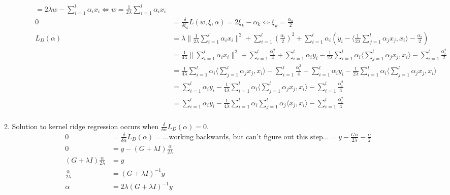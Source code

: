 \documentclass{article}
\newcommand*{\0}{\Vec{0}}
\newcommand*{\al}{\alpha}
\newcommand*{\de}{\delta}
\newcommand*{\la}{\lambda}
\begin{document}
\begin{enumerate}
\begin{enumerate}
\begin{description}
\begin{align*}
							= 2\la w - \sum_{i=1}^l\al_i x_i \iff
							w = \frac{1}{2\la}\sum_{i=1}^l\al_i x_i \\
							0 &= \frac{\de}{\de \xi_k}L(w,\xi,\al)
							= 2\xi_k-\al_k \iff \xi_k = \frac{\al_k}{2} \\
							L_D(\al)
							&= \la\| \frac{1}{2\la}\sum_{i=1}^l\al_i x_i \|^2 +\sum_{i=1}^l\left( \frac{\al_i}{2} \right)^2+\sum_{i=1}^l\al_i(y_i - \langle \frac{1}{2\la}\sum_{j=1}^l\al_j x_j, x_i \rangle - \frac{\al_i}{2}) \\
							&= \frac{1}{4\la}\| \sum_{i=1}^l\al_i x_i \|^2 +\sum_{i=1}^l \frac{\al_i^2}{4} +\sum_{i=1}^l\al_iy_i - \frac{1}{2\la}\sum_{i=1}^l\al_i\langle \sum_{j=1}^l\al_j x_j, x_i \rangle - \sum_{i=1}^l \frac{\al_i^2}{2} \\
							&= \frac{1}{4\la}\sum_{i=1}^l\al_i\langle \sum_{j=1}^l\al_j x_j, x_i \rangle -\sum_{i=1}^l \frac{\al_i^2}{4} +\sum_{i=1}^l\al_iy_i - \frac{1}{2\la}\sum_{i=1}^l\al_i\langle \sum_{j=1}^l\al_j x_j, x_i \rangle \\
							&= \sum_{i=1}^l\al_iy_i - \frac{1}{4\la}\sum_{i=1}^l\al_i\langle \sum_{j=1}^l\al_j x_j, x_i \rangle -\sum_{i=1}^l \frac{\al_i^2}{4} \\
							&= \sum_{i=1}^l\al_iy_i - \frac{1}{4\la}\sum_{i=1}^l\al_i \sum_{j=1}^l\al_j \langle x_j, x_i \rangle -\sum_{i=1}^l \frac{\al_i^2}{4} \\
						\end{align*}
				\end{description}
			\item Solution to kernel ridge regression occurs when $\frac{\de}{\de \al}L_D(\al)=0$.
				\begin{align*}
					0 &= \frac{\de}{\de \al}L_D(\al)
					= \ldots \text{working backwards, but can't figure out this step} \ldots
					= y -\frac{G\al}{2\la} - \frac{\al}{2} \\
					0 &= y - \left(G + \la I\right)\frac{\al}{2\la} \\
					\left(G + \la I\right)\frac{\al}{2\la} &= y \\
					\frac{\al}{2\la} &= \left(G + \la I\right)^{-1}y \\
					\al &= 2\la\left(G + \la I\right)^{-1}y \\
				\end{align*}
		\end{enumerate}
\end{enumerate}

%
%
\end{document}
